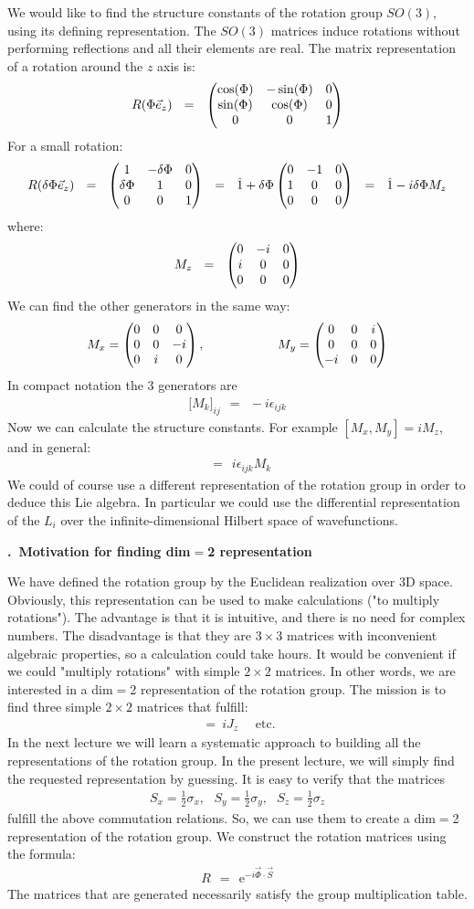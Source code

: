 \documentclass[onecolumn,fleqn, 11pt]{revtex4}
\newcommand{\eexp}{\mathrm{e}^}
\newcommand{\amatrix}[1]{\begin{matrix} #1 \end{matrix}}
\newcommand{\beq}{\begin{eqnarray}}
\newcommand{\eeq}{\end{eqnarray}}
\renewcommand{\thesubsection}{\arabic{subsection}}
\renewcommand{\thesubsubsection}{\arabic{subsubsection}}
\newcommand{\sheadC}[1]
{
\addtocounter{subsubsection}{1}
\vspace{5mm}
{\bf \thesubsection.\thesubsubsection \ #1}  
\nopagebreak
\phantomsection
}
\begin{document}
We would like to find the structure constants 
of the rotation group ${SO(3)}$, 
using its defining representation. 
The ${SO(3)}$ matrices induce rotations without 
performing reflections and all their elements are real. 
The matrix representation of a rotation around the ${z}$ axis is:
\beq
R(\Phi\vec{e}_z)
\ \ = \ \ \left(\amatrix{ 
\cos(\Phi) & -\sin(\Phi) & 0 \cr 
\sin(\Phi) & \cos(\Phi) & 0 \cr 
0 & 0 & 1 } 
\right) 
\eeq
For a small rotation:
\beq
R(\delta\Phi\vec{e}_z) 
\ \ = \ \ \left( \amatrix{ 
1 & -\delta\Phi & 0 \cr 
\delta\Phi & 1 & 0 \cr 
0 & 0 & 1} \right) 
\ \ = \ \ \hat{1}+\delta\Phi \left( \amatrix{ 
0 & -1 & 0 \cr 
1 & 0 & 0 \cr 
0 & 0 & 0} 
\right) 
\ \ = \ \ \hat{1} -i\delta\Phi M_z 
\eeq
where:
\beq
M_z \ \ = \ \ \left( \amatrix{ 0 & -i & 0 \cr i & 0 & 0 \cr 0 & 0 & 0 } \right) 
\eeq
We can find the other generators in the same way:
\beq
M_x = \left( \amatrix{ 0 & 0 & 0 \cr 0 & 0 & -i \cr 0 & i & 0 } \right),  
\hspace{2cm}
M_y = \left( \amatrix{ 0 & 0& i \cr 0 & 0 & 0 \cr -i & 0 & 0 } \right ) 
\eeq
In compact notation the 3 generators are 
\beq
\Big[ M_k \Big]_{ij} \ \ = \ \ -i\epsilon_{ijk}
\eeq
Now we can calculate the structure constants. 
For example ${[M _ x, M_y ] = iM_z}$, and in general: 
\beq
[M_i,M_j] \ \ = \ \ i\epsilon_{ijk}M_k 
\eeq
We could of course use a different representation of the rotation group 
in order to deduce this Lie algebra. In particular we could use the 
differential representation of the $L_i$ over the infinite-dimensional 
Hilbert space of wavefunctions. 


 
\sheadC{Motivation for finding dim$=$2 representation} 

We have defined the rotation group by the Euclidean realization 
over 3D space. Obviously, this representation can be used 
to make calculations ("to multiply rotations"). The advantage 
is that it is intuitive, and there is no need for complex numbers. 
The disadvantage is that they are $3\times 3$ matrices 
with inconvenient algebraic properties, so a calculation 
could take hours. It would be convenient if we could "multiply rotations" 
with simple $2 \times 2$ matrices. In other words, we are interested 
in a dim$=$2 representation of the rotation group. The mission is to find 
three simple $2 \times 2$ matrices that fulfill:
\beq
[ J_x,J_y] \ = \ iJ_z \,\,\,\,\,\,\,\, \mbox{etc.} 
\eeq
In the next lecture we will learn a systematic approach to building 
all the representations of the rotation group. In the present lecture, 
we will simply find the requested representation by guessing. 
It is easy to verify that the matrices
\beq
S_x = \frac{1}{2}\sigma_x , 
\ \ \ S_y = \frac{1}{2}\sigma_y , 
\ \ \ S_z = \frac{1}{2}\sigma_z 
\eeq
fulfill the above commutation relations. So, we can use them 
to create a dim$=$2 representation of the rotation group. 
We construct the rotation matrices using the formula:
\beq
R \ \ = \ \ \eexp{-i \vec{\Phi} \cdot \vec{S}} 
\eeq
The matrices that are generated necessarily satisfy  
the group multiplication table. 
\end{document}
